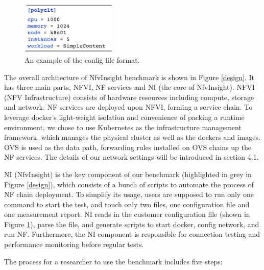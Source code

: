 \begin{figure}[!t]
\centering
\includegraphics[width=1.8in]{fig/config_file.pdf}
\caption{An example of the config file format.}
\label{config}
\end{figure}

The overall architecture of NfvInsight benchmark is shown in Figure \ref{design}.
It has three main parts, NFVI, NF services and NI (the core of NfvInsight).
NFVI (NFV Infrastructure) consists of hardware resources
including compute, storage and network.
NF services are deployed upon NFVI, forming a service chain.
To leverage docker's light-weight isolation
and convenience of packing a runtime environment,
we chose to use Kubernetes as the infrastructure management framework,
which manages the physical cluster as well as the dockers and images.
OVS is used as the data path,
forwarding rules installed on OVS chains up the NF services.
The details of our network settings will be introduced in section 4.1.

NI (NfvInsight) is the key component of our benchmark
(highlighted in grey in Figure  \ref{design}),
which consists of a bunch of scripts
to automate the process of NF chain deployment.
To simplify its usage,
users are supposed to run only one command to start the test,
and touch only two files,
one configuration file and one measurement report.
NI reads in the customer configuration file (shown in Figure \ref{config}),
parse the file, and generate scripts to start docker, config network, and run NF.
Furthermore, the NI component is responsible for connection testing and performance monitoring
before regular tests.

The process for a researcher to use the benchmark includes five steps:


